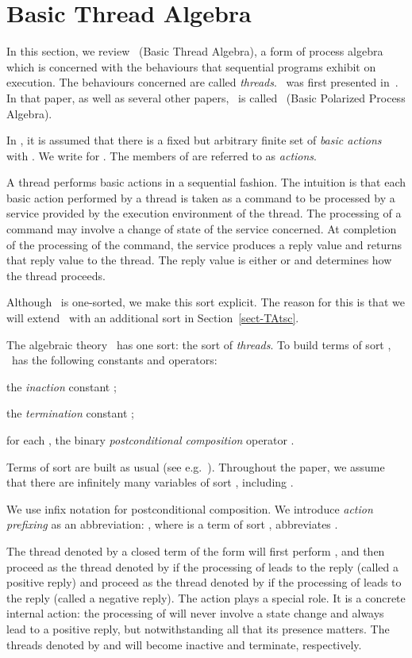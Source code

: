 \documentclass[fleqn]{llncs}
\begin{document}
\section{Basic Thread Algebra}
\label{sect-BTA}

In this section, we review \BTA\ (Basic Thread Algebra), a form of
process algebra which is concerned with the behaviours that sequential
programs exhibit on execution.
The behaviours concerned are called \emph{threads}.
\BTA\ was first presented in~\cite{BL02a}.
In that paper, as well as several other papers, \BTA\ is called \BPPA\
(Basic Polarized Process Algebra).

In \BTA, it is assumed that there is a fixed but arbitrary finite set of
\emph{basic actions}  with .
We write  for .
The members of  are referred to as \emph{actions}.

A thread performs basic actions in a sequential fashion.
The intuition is that each basic action performed by a thread is taken
as a command to be processed by a service provided by the execution
environment of the thread.
The processing of a command may involve a change of state of the service
concerned.
At completion of the processing of the command, the service produces a
reply value and returns that reply value to the thread.
The reply value is either  or  and determines how the
thread proceeds.

Although \BTA\ is one-sorted, we make this sort explicit.
The reason for this is that we will extend \BTA\ with an additional sort
in Section~\ref{sect-TAtsc}.

The algebraic theory \BTA\ has one sort: the sort  of
\emph{threads}.
To build terms of sort , \BTA\ has the following constants and
operators:
\begin{iteml}
\item
the \emph{inaction} constant ;
\item
the \emph{termination} constant ;
\item
for each , the binary \emph{postconditional composition}
operator .
\end{iteml}
Terms of sort  are built as usual (see e.g.~\cite{ST99a,Wir90a}).
Throughout the paper, we assume that there are infinitely many variables
of sort , including .

We use infix notation for postconditional composition.
We introduce \emph{action prefixing} as an abbreviation: ,
where  is a term of sort , abbreviates .

The thread denoted by a closed term of the form  will
first perform , and then proceed as the thread denoted by  if the
processing of  leads to the reply  (called a positive reply)
and proceed as the thread denoted by  if the processing of  leads
to the reply  (called a negative reply).
The action  plays a special role.
It is a concrete internal action: the processing of  will never
involve a state change and always lead to a positive reply, but
notwithstanding all that its presence matters.
The threads denoted by  and  will become inactive and
terminate, respectively.
\end{document}
